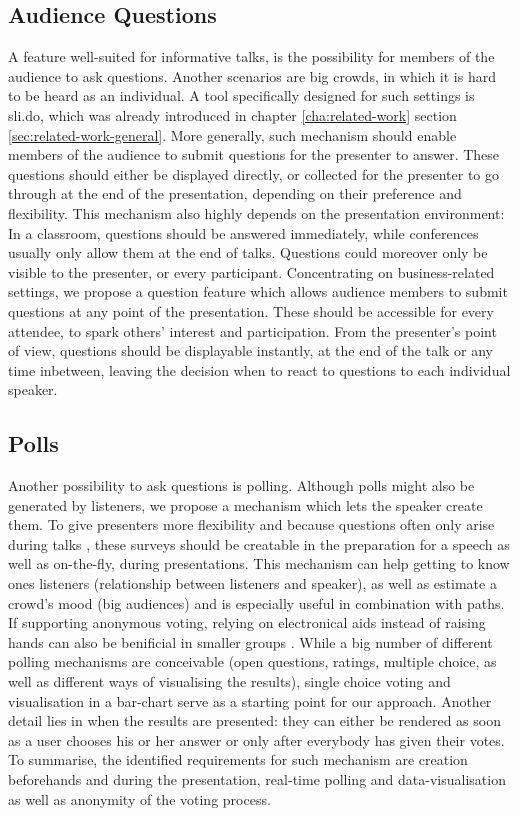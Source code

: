 \subsection{Audience Questions}
A feature well-suited for informative talks, is the possibility for members of the audience to ask questions. Another scenarios are big crowds, in which it is hard to be heard as an individual. A tool specifically designed for such settings is sli.do, which was already introduced in chapter \ref{cha:related-work} section \ref{sec:related-work-general}.
More generally, such mechanism should enable members of the audience to submit questions for the presenter to answer. These questions should either be displayed directly, or collected for the presenter to go through at the end of the presentation, depending on their preference and flexibility. This mechanism also highly depends on the presentation environment: In a classroom, questions should be answered immediately, while conferences usually only allow them at the end of talks. Questions could moreover only be visible to the presenter, or every participant. Concentrating on business-related settings, we propose a question feature which allows audience members to submit questions at any point of the presentation. These should be accessible for every attendee, to spark others' interest and participation. From the presenter's point of view, questions should be displayable instantly, at the end of the talk or any time inbetween, leaving the decision when to react to questions to each individual speaker.


\subsection{Polls}
Another possibility to ask questions is polling. Although polls might also be generated by listeners, we propose a mechanism which lets the speaker create them. To give presenters more flexibility and because questions often only arise during talks \cite{Esponda:ElectronicVotingOnTheFly}, these surveys should be creatable in the preparation for a speech as well as on-the-fly, during presentations. This mechanism can help getting to know ones listeners (relationship between listeners and speaker), as well as estimate a crowd's mood (big audiences) and is especially useful in combination with paths. If supporting anonymous voting, relying on electronical aids instead of raising hands can also be benificial in smaller groups \cite{Esponda:ElectronicVotingOnTheFly}.
While a big number of different polling mechanisms are conceivable (open questions, ratings, multiple choice, as well as different ways of visualising the results), single choice voting and visualisation in a bar-chart serve as a starting point for our approach. Another detail lies in when the results are presented: they can either be rendered as soon as a user chooses his or her answer or only after everybody has given their votes.
To summarise, the identified requirements for such mechanism are creation beforehands and during the presentation, real-time polling and data-visualisation as well as anonymity of the voting process.

